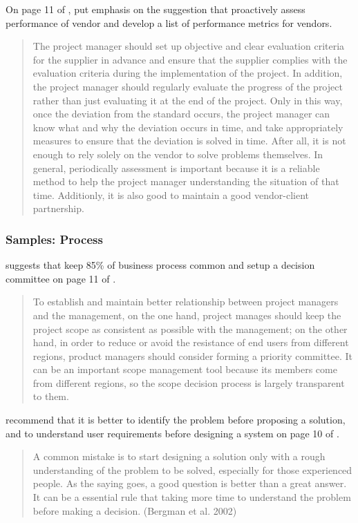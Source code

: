 On page 11 of , \citeauthor{2} put emphasis on the suggestion that proactively assess performance of vendor and develop a list of performance metrics for vendors.

\begin{quotation}
  The project manager should set up objective and clear evaluation criteria for the supplier in advance and ensure that the supplier complies with the evaluation criteria during the implementation of the project. In addition, the project manager should regularly evaluate the progress of the project rather than just evaluating it at the end of the project. Only in this way, once the deviation from the standard occurs, the project manager can know what and why the deviation occurs in time, and take appropriately measures to ensure that the deviation is solved in time. After all, it is not enough to rely solely on the vendor to solve problems themselves. In general, periodically assessment is important because it is a reliable method to help the project manager understanding the situation of that time. Additionly, it is also good to maintain a good vendor-client partnership.
\end{quotation}

\subsubsection{Samples: Process}
\citeauthor{2} suggests that keep 85\% of business process common and setup a decision committee on page 11 of .

\begin{quotation}
  To establish and maintain better relationship between project managers and the management, on the one hand, project manages should keep the project scope as consistent as possible with the management; on the other hand, in order to reduce or avoid the resistance of end users from different regions, product managers should consider forming a priority committee. It can be an important scope management tool because its members come from different regions, so the scope decision process is largely transparent to them.
\end{quotation}

\citeauthor{6} recommend that it is better to identify the problem before proposing a solution, and to understand user requirements before designing a system on page 10 of .

\begin{quotation}
A common mistake is to start designing a solution only with a rough understanding of the problem to be solved, especially for those experienced people. As the saying goes, a good question is better than a great answer. It can be a essential rule that taking more time to understand the problem before making a decision. (Bergman et al. 2002)
\end{quotation}

